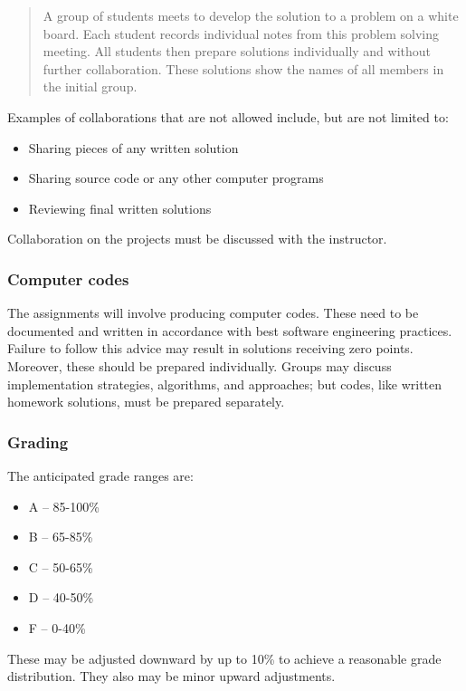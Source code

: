 \documentclass{article}
\begin{document}
\begin{quote}%
A group of students meets to develop the solution to a problem on a white board. Each student records individual notes from this problem solving meeting. All students then prepare solutions individually and without further collaboration. These solutions show the names of all members in the initial group.


\end{quote}
Examples of collaborations that are not allowed include, but are not limited to:

\begin{itemize}%
\item Sharing pieces of any written solution
\item Sharing source code or any other computer programs
\item Reviewing final written solutions

\end{itemize}
Collaboration on the projects must be discussed with the instructor.

\hypertarget{computer_codes_19}{}\subsubsection*{{Computer codes}}\label{computer_codes_19}

The assignments will involve producing computer codes. These need to be documented and written in accordance with best software engineering practices. Failure to follow this advice may result in solutions receiving zero points. Moreover, these should be prepared individually. Groups may discuss implementation strategies, algorithms, and approaches; but codes, like written homework solutions, must be prepared separately.

\hypertarget{grading_20}{}\subsubsection*{{Grading}}\label{grading_20}

The anticipated grade ranges are:

\begin{itemize}%
\item A --{} 85-100\%
\item B --{} 65-85\%
\item C --{} 50-65\%
\item D --{} 40-50\%
\item F --{} 0-40\%

\end{itemize}
These may be adjusted downward by up to 10\% to achieve a reasonable grade distribution. They also may be minor upward adjustments.
\end{document}
